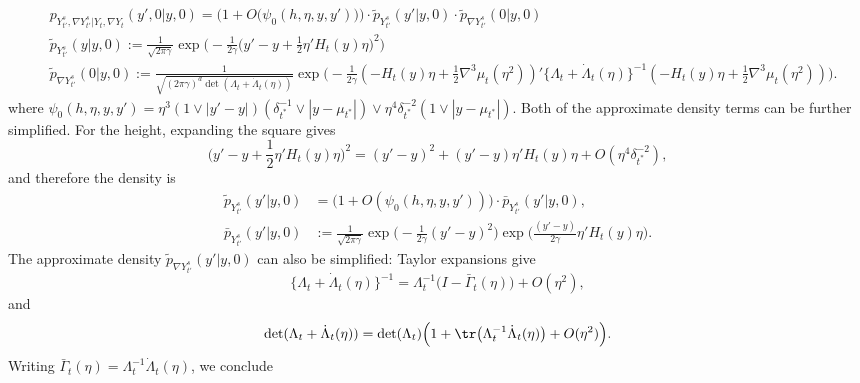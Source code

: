 \documentclass{article}
\begin{document}
	\begin{align*}
		& p_{Y_{t'}^s, \nabla Y_{t'}^s|Y_t,\nabla Y_t}(y',0|y,0) 
		= 
		\Big(1 + O\big(\psi_0(h,\eta,y,y')\big)\Big) \cdot \tilde{p}_{Y_{t'}^s}(y'|y,0) \cdot \tilde{p}_{\nabla Y_{t'}^s}(0|y,0) \\
		& \tilde{p}_{Y_{t'}^s}(y|y,0) 
		:= 
		\frac{1}{\sqrt{2 \pi \gamma}} \exp\Big(-\frac{1}{2\gamma}\big(y' - y + \frac{1}{2}\eta'H_t(y)\eta\big)^2\Big) \\
		& \tilde{p}_{\nabla Y_{t'}^s}(0|y,0) 
		:= 
		\frac{1}{\sqrt{(2 \pi \gamma)^d \det(\Lambda_t + \dot{\Lambda}_t(\eta))}} \exp\Big(-\frac{1}{2\gamma}(-H_t(y)\eta + \frac{1}{2}\nabla^3\mu_t(\eta^2))'\{\Lambda_t + \dot{\Lambda}_t(\eta)\}^{-1}(-H_t(y)\eta + \frac{1}{2}\nabla^3\mu_t(\eta^2))\Big).
	\end{align*}
	where $\psi_0(h,\eta,y,y') = \eta^3(1 \vee |y' - y|)(\delta_{t^*}^{-1} \vee |y - \mu_{t^*}|) \vee \eta^4 \delta_{t^*}^{-2}(1 \vee |y - \mu_{t^*}|)$. Both of the approximate density terms can be further simplified. For the height, expanding the square gives
	\begin{equation*}
		\big(y' - y + \frac{1}{2}\eta'H_t(y)\eta\big)^2
		= (y' - y)^2 + (y' - y)\eta'H_t(y)\eta + O(\eta^4 \delta_{t^*}^{-2}),
	\end{equation*}
	and therefore the density is 
	\begin{equation}
		\label{eqn:randomized-kac-rice-density-height}
		\begin{aligned}
			\tilde{p}_{Y_{t'}^s}(y'|y,0) 
			& = \big(1 + O(\psi_0(h,\eta,y,y'))\big) \cdot \bar{p}_{Y_{t'}^s}(y'|y,0),  \\
			\bar{p}_{Y_{t'}^s}(y'|y,0) 
			& := \frac{1}{\sqrt{2 \pi \gamma}}\exp\Big(-\frac{1}{2\gamma}(y' - y)^2\Big)\exp\Big(\frac{(y' - y)}{2\gamma}\eta'H_t(y)\eta\Big).
		\end{aligned}
	\end{equation} 
	The approximate density $\tilde{p}_{\nabla Y_{t'}^s}(y'|y,0)$ can also be simplified: Taylor expansions give
	\begin{equation*}
		\{\Lambda_t + \dot{\Lambda}_t(\eta)\}^{-1} = \Lambda_t^{-1}\big(I - \bar{\Gamma}_{t}(\eta)\big) + O(\eta^2),
	\end{equation*}
	and
	\begin{equation*}
		\det(\Lambda_t + \dot{\Lambda}_t(\eta)) = \det(\Lambda_t)\Big(1 + \tr\big(\Lambda_t^{-1}\dot{\Lambda}_{t}(\eta)\big) + O(\eta^2)\Big).
	\end{equation*}
	Writing $\bar{\Gamma}_t(\eta) = \Lambda_t^{-1}\dot{\Lambda}_t(\eta)$, we conclude
\end{document}
